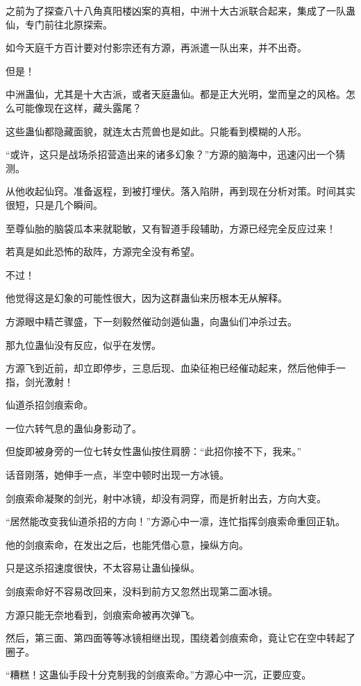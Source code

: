 \begin{this_body}
之前为了探查八十八角真阳楼凶案的真相，中洲十大古派联合起来，集成了一队蛊仙，专门前往北原探索。

如今天庭千方百计要对付影宗还有方源，再派遣一队出来，并不出奇。

但是！

中洲蛊仙，尤其是十大古派，或者天庭蛊仙。都是正大光明，堂而皇之的风格。怎么可能像现在这样，藏头露尾？

这些蛊仙都隐藏面貌，就连太古荒兽也是如此。只能看到模糊的人形。

“或许，这只是战场杀招营造出来的诸多幻象？”方源的脑海中，迅速闪出一个猜测。

从他收起仙窍。准备返程，到被打埋伏。落入陷阱，再到现在分析对策。时间其实很短，只是几个瞬间。

至尊仙胎的脑袋瓜本来就聪敏，又有智道手段辅助，方源已经完全反应过来！

若真是如此恐怖的敌阵，方源完全没有希望。

不过！

他觉得这是幻象的可能性很大，因为这群蛊仙来历根本无从解释。

方源眼中精芒骤盛，下一刻毅然催动剑遁仙蛊，向蛊仙们冲杀过去。

那九位蛊仙没有反应，似乎在发愣。

方源飞到近前，却立即停步，三息后现、血染征袍已经催动起来，然后他伸手一指，剑光激射！

仙道杀招剑痕索命。

一位六转气息的蛊仙身影动了。

但旋即被身旁的一位七转女性蛊仙按住肩膀：“此招你接不下，我来。”

话音刚落，她伸手一点，半空中顿时出现一方冰镜。

剑痕索命凝聚的剑光，射中冰镜，却没有洞穿，而是折射出去，方向大变。

“居然能改变我仙道杀招的方向！”方源心中一凛，连忙指挥剑痕索命重回正轨。

他的剑痕索命，在发出之后，也能凭借心意，操纵方向。

只是这杀招速度很快，不太容易让蛊仙操纵。

剑痕索命好不容易改回来，没料到前方又忽然出现第二面冰镜。

方源只能无奈地看到，剑痕索命被再次弹飞。

然后，第三面、第四面等等冰镜相继出现，围绕着剑痕索命，竟让它在空中转起了圈子。

“糟糕！这蛊仙手段十分克制我的剑痕索命。”方源心中一沉，正要应变。


\end{this_body}
